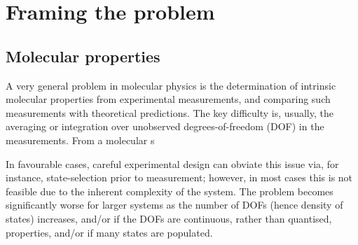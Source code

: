 \section{Framing the problem}

\subsection{Molecular properties}
A very general problem in molecular physics is the determination of intrinsic molecular properties from experimental measurements, and comparing such measurements with theoretical predictions. The key difficulty is, usually, the averaging or integration over unobserved degrees-of-freedom (DOF) in the measurements. From a molecular s

In favourable cases, careful experimental design can obviate this issue via, for instance, state-selection prior to measurement; however, in most cases this is not feasible due to the inherent complexity of the system. The problem becomes significantly worse for larger systems as the number of DOFs (hence density of states) increases, and/or if the DOFs are continuous, rather than quantised, properties, and/or if many states are populated.